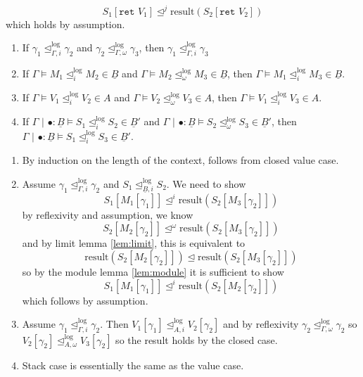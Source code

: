 \documentclass[acmsmall,screen,12pt]{acmart}
\newif\iflong
\renewcommand{\u}{\underline}
\newcommand{\pipe}{\,\,|\,\,}
\newcommand{\apreorder}{\trianglelefteq}
\newcommand{\ix}[2]{\mathrel{#1^{#2}}}
\newcommand{\itylrof}[3]{\ilrof{#1}{#3,#2}}
\newcommand{\ilrof}[2]{\mathrel{{#1}^{\text{log}}_{#2}}}
\newcommand{\itylr}[2]{\itylrof{\apreorder}{#1}{#2}}
\newcommand{\ilr}[1]{\ilrof{\apreorder}{#1}}
\newcommand{\result}{\text{result}}
\newcommand{\kw}[1]{\texttt{#1}\,\,}
\newcommand{\ret}{\kw{ret}}
\begin{document}
{\begin{longproof}
\begin{enumerate}
    \[ S_1[\ret V_1] \ix\apreorder j \result(S_2[\ret V_2]) \]
    which holds by assumption.
  \end{enumerate}
\end{longproof}
\iflong
\begin{lemma}\hfill
  \begin{enumerate}
  \item If $\gamma_1 \itylr i \Gamma \gamma_2$ and $\gamma_2 \itylr
    \omega \Gamma \gamma_3$, then $\gamma_1 \itylr i \Gamma \gamma_3$
  \item If $\Gamma \vDash M_1 \ilr i M_2 \in \u B$ and
    $\Gamma \vDash M_2 \ilr \omega M_3 \in \u B$, then
    $\Gamma \vDash M_1 \ilr i M_3 \in \u B$.
  \item If $\Gamma \vDash V_1 \ilr i V_2 \in A$ and
    $\Gamma \vDash V_2 \ilr \omega V_3 \in A$, then
    $\Gamma \vDash V_1 \ilr i V_3 \in A$.
  \item If $\Gamma \pipe \bullet : \u B \vDash S_1 \ilr i S_2 \in \u B'$ and
    $\Gamma\pipe \bullet : \u B \vDash S_2 \ilr \omega S_3 \in \u B'$, then
    $\Gamma\pipe \bullet : \u B \vDash S_1 \ilr i S_3 \in \u B'$.
  \end{enumerate}
\end{lemma}
\begin{longproof}
  \begin{enumerate}
  \item By induction on the length of the context, follows from closed value case.
  \item Assume $\gamma_1 \itylr i \Gamma \gamma_2$ and $S_1 \itylr i {\u B} S_2$.
    We need to show
    \[ S_1[M_1[\gamma_1]] \ix\apreorder{i} \result(S_2[M_3[\gamma_2]]) \]
    by reflexivity and assumption, we know
    \[ S_2[M_2[\gamma_2]] \ix\apreorder \omega \result(S_2[M_3[\gamma_2]])\]
    and by limit lemma \ref{lem:limit}, this is equivalent to
    \[ \result(S_2[M_2[\gamma_2]]) \apreorder \result(S_2[M_3[\gamma_2]])\]
    so by the module lemma \ref{lem:module} it is sufficient to show
    \[ S_1[M_1[\gamma_1]] \ix\apreorder{i} \result(S_2[M_2[\gamma_2]]) \]
    which follows by assumption.
  \item Assume $\gamma_1 \itylr i \Gamma \gamma_2$.  Then
    $V_1[\gamma_1] \itylr i A V_2[\gamma_2]$ and by reflexivity
    $\gamma_2 \itylr \omega \Gamma \gamma_2$ so $V_2[\gamma_2] \itylr
    \omega A V_3[\gamma_2]$ so the result holds by the closed case.
  \item Stack case is essentially the same as the value case.

\end{enumerate}
\end{longproof}}
\end{document}
